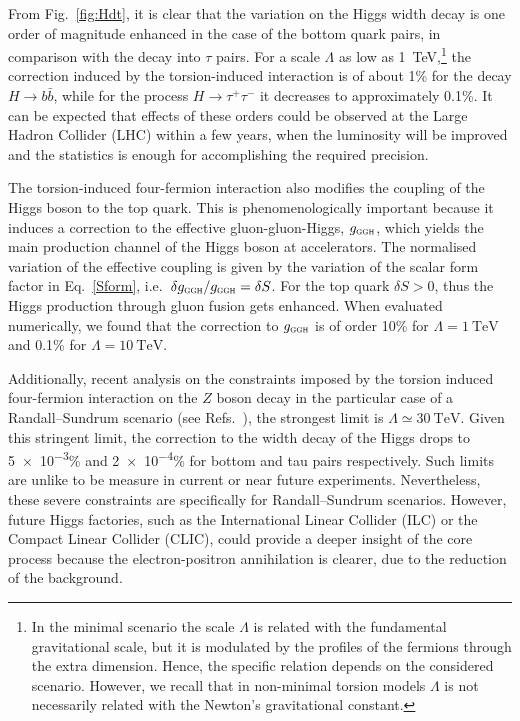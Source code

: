 \documentclass{ws-mpla}
\renewcommand{\(}{\left(}
\renewcommand{\)}{\right)}
\renewcommand{\[}{\left[}
\renewcommand{\]}{\right]}
\begin{document}
From Fig.~\ref{fig:Hdt}, it is clear that the variation on the Higgs width decay is one order of magnitude enhanced in the case of the bottom quark pairs, in comparison with the decay into $\tau$ pairs. For a scale $\Lambda$ as low as \SI{1}{\TeV},\footnote{In the minimal scenario the scale $\Lambda$ is related with the fundamental gravitational scale, but it is modulated by the profiles of the fermions through the extra dimension. Hence, the specific relation depends on the considered scenario. However, we recall that in non-minimal torsion models $\Lambda$ is not necessarily related with the Newton's gravitational constant.} the correction induced by the torsion-induced interaction is of about \num{1}\% for the decay $H \to b \bar{b}$, while for the process $H \to \tau^+ \tau^-$ it decreases to approximately \num{.1}\%. It can be expected that effects of these orders could be observed at the Large Hadron Collider (LHC) within a few years, when the luminosity will be improved and the statistics is enough for accomplishing the required precision.

The torsion-induced four-fermion interaction also modifies the coupling of the Higgs boson to the top quark. This is phenomenologically important because it induces a correction to the effective gluon-gluon-Higgs, $g_{\textsc{ggh}}$, which yields the main production channel of the Higgs boson at accelerators. The normalised variation of the effective coupling is given by the variation of the scalar form factor in Eq.~\eqref{Sform}, i.e.~$\delta g_{\textsc{ggh}} / g_{\textsc{ggh}} = \delta S$. For the top quark $\delta S > 0$, thus the Higgs production through gluon fusion gets enhanced. When evaluated numerically, we found that the correction to $g_{\textsc{ggh}}$ is of order \num{10}\% for $\Lambda = \SI{1}{\TeV}$ and \num{.1}\% for $\Lambda = \SI{10}{\TeV}$.

Additionally, recent analysis on the constraints imposed by the torsion induced four-fermion interaction on the $Z$ boson decay in the particular case of a Randall--Sundrum scenario (see Refs.~), the strongest limit is $\Lambda \simeq \SI{30}{\TeV}$. Given this stringent limit, the correction to the width decay of the Higgs drops to \num[exponent-product = \cdot]{5e-3}\% and \num[exponent-product = \cdot]{2e-4}\% for bottom and tau pairs respectively. Such limits are unlike to be measure in current or near future experiments. Nevertheless, these severe constraints are specifically for Randall--Sundrum scenarios. However, future Higgs factories, such as the International Linear Collider (ILC) or the Compact Linear Collider (CLIC), could provide a deeper insight of the core process because the electron-positron annihilation is clearer, due to the reduction of the background.
\end{document}
